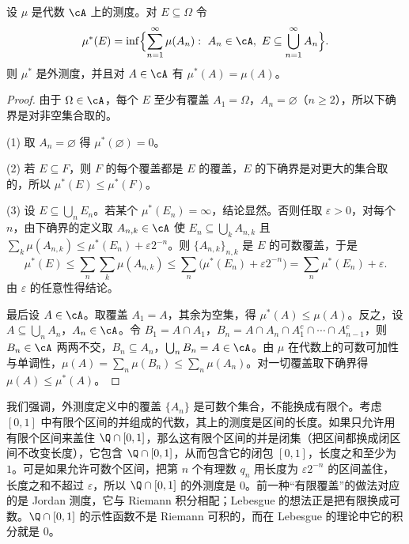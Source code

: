 \begin{proposition}[由代数上的测度诱导的外测度]\label{prop:extension:induced-outer}
设 $\mu$ 是代数 $\cA$ 上的测度。对 $E\subseteq\Omega$ 令
\[
\mu^*(E)=\inf\Bigl\{\sum_{n=1}^\infty\mu(A_n):\ A_n\in\cA,\ E\subseteq\bigcup_{n=1}^\infty A_n\Bigr\}.
\]
则 $\mu^*$ 是外测度，并且对 $A\in\cA$ 有 $\mu^*(A)=\mu(A)$。
\end{proposition}
\begin{proof}
由于 $\Omega\in\cA$，每个 $E$ 至少有覆盖 $A_1=\Omega$，$A_n=\varnothing$（$n\geqslant2$），所以下确界是对非空集合取的。

(1) 取 $A_n=\varnothing$ 得 $\mu^*(\varnothing)=0$。

(2) 若 $E\subseteq F$，则 $F$ 的每个覆盖都是 $E$ 的覆盖，$E$ 的下确界是对更大的集合取的，所以 $\mu^*(E)\leqslant\mu^*(F)$。

(3) 设 $E\subseteq\bigcup_nE_n$。若某个 $\mu^*(E_n)=\infty$，结论显然。否则任取 $\varepsilon>0$，对每个 $n$，由下确界的定义取 $A_{n,k}\in\cA$ 使 $E_n\subseteq\bigcup_kA_{n,k}$ 且 $\sum_k\mu(A_{n,k})\leqslant\mu^*(E_n)+\varepsilon2^{-n}$。则 $\{A_{n,k}\}_{n,k}$ 是 $E$ 的可数覆盖，于是
\[
\mu^*(E)\leqslant\sum_n\sum_k\mu(A_{n,k})\leqslant\sum_n\bigl(\mu^*(E_n)+\varepsilon2^{-n}\bigr)=\sum_n\mu^*(E_n)+\varepsilon.
\]
由 $\varepsilon$ 的任意性得结论。

最后设 $A\in\cA$。取覆盖 $A_1=A$，其余为空集，得 $\mu^*(A)\leqslant\mu(A)$。反之，设 $A\subseteq\bigcup_nA_n$，$A_n\in\cA$。令 $B_1=A\cap A_1$，$B_n=A\cap A_n\cap A_1^c\cap\cdots\cap A_{n-1}^c$，则 $B_n\in\cA$ 两两不交，$B_n\subseteq A_n$，$\bigcup_nB_n=A\in\cA$。由 $\mu$ 在代数上的可数可加性与单调性，$\mu(A)=\sum_n\mu(B_n)\leqslant\sum_n\mu(A_n)$。对一切覆盖取下确界得 $\mu(A)\leqslant\mu^*(A)$。
\end{proof}

\begin{example}[覆盖必须是可数的]
我们强调，外测度定义中的覆盖 $\{A_n\}$ 是可数个集合，不能换成有限个。考虑 $[0,1]$ 中有限个区间的并组成的代数，其上的测度是区间的长度。如果只允许用有限个区间来盖住 $\Q\cap[0,1]$，那么这有限个区间的并是闭集（把区间都换成闭区间不改变长度），它包含 $\Q\cap[0,1]$，从而包含它的闭包 $[0,1]$，长度之和至少为 $1$。可是如果允许可数个区间，把第 $n$ 个有理数 $q_n$ 用长度为 $\varepsilon2^{-n}$ 的区间盖住，长度之和不超过 $\varepsilon$，所以 $\Q\cap[0,1]$ 的外测度是 $0$。前一种“有限覆盖”的做法对应的是 Jordan 测度，它与 Riemann 积分相配；Lebesgue 的想法正是把有限换成可数。$\Q\cap[0,1]$ 的示性函数不是 Riemann 可积的，而在 Lebesgue 的理论中它的积分就是 $0$。
\end{example}

